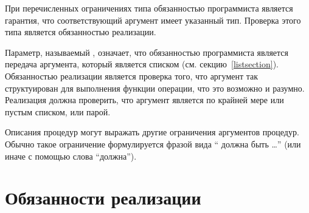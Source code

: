 При перечисленных ограничениях типа обязанностью программиста является гарантия, что
соответствующий аргумент имеет указанный тип. Проверка этого типа является обязанностью
реализации.\vspace{2.1mm}

Параметр, называемый , означает, что обязанностью программиста является передача
аргумента, который является списком (см. секцию~\ref{listsection}). Обязанностью реализации
является проверка того, что аргумент так структуирован для выполнения функции операции, что это
возможно и разумно. Реализация должна проверить, что аргумент является по крайней мере или
пустым списком, или парой.\vspace{2.1mm}

Описания процедур могут выражать другие ограничения аргументов процедур. Обычно такое
ограничение формулируется фразой вида `` должна быть \ldots'' (или иначе
с помощью слова ``должна'').\vspace{2.1mm}

\section{Обязанности реализации}\vspace{2.1mm}

